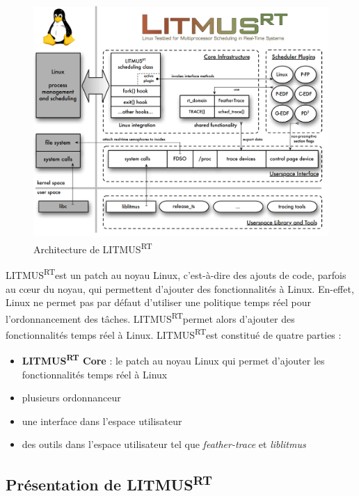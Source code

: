 \documentclass{article}
\newcommand{\litmus}{LITMUS\textsuperscript{RT}}
\begin{document}
\begin{figure}[H]
    \centering
    \includegraphics[width=0.5\paperwidth]{Images/litmusrtarchitecture.png}
    \caption{Architecture de \litmus}
    \label{fig:litmusrtarchitecture}
\end{figure}

    \litmus est un patch au noyau Linux, c'est-à-dire des ajouts de code, parfois au cœur du noyau, qui permettent d'ajouter des fonctionnalités à Linux. En-effet, Linux ne permet pas par défaut d'utiliser une politique temps réel pour l'ordonnancement des tâches. \litmus permet alors d'ajouter des fonctionnalités temps réel à Linux. \litmus est constitué de quatre parties : 
    \begin{itemize}
        \item \textbf{LITMUS\textsuperscript{RT} Core} : le patch au noyau Linux qui permet d'ajouter les fonctionnalités temps réel à Linux
        \item plusieurs \gls{ordonnanceur}
        \item une interface dans l'espace utilisateur
        \item des outils dans l'espace utilisateur tel que \textit{feather-trace} et \textit{liblitmus}
    \end{itemize}


    \subsection{Présentation de \litmus}
    
    
\end{document}

